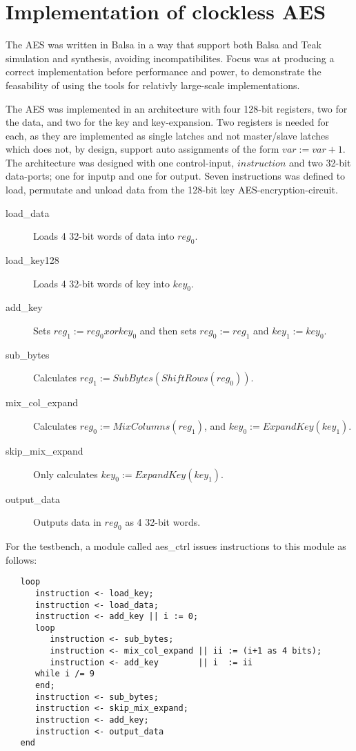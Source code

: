 \section{Implementation of clockless AES}

The AES was written in Balsa in a way that support both Balsa and
Teak simulation and synthesis, avoiding incompatibilites. Focus was at
producing a correct implementation before performance and power, to
demonstrate the feasability of using the tools for relativly
large-scale implementations.

The AES was implemented in an architecture with four 128-bit
registers, two for the data, and two for the key and
key-expansion. Two registers is needed for each, as they are
implemented as single latches and not master/slave latches which does
not, by design, support auto assignments of the form 
$var := var + 1$. The architecture was designed with one control-input,
$instruction$ and two 32-bit data-ports; one for inputp and one for
output. Seven instructions was defined to load, permutate and unload
data from the 128-bit key AES-encryption-circuit.

\begin{description}
  \item[load\_data] Loads 4 32-bit words of data into $reg_0$.
  \item[load\_key128] Loads 4 32-bit words of key into $key_0$.
  \item[add\_key] Sets $reg_1 := reg_0 xor key_0$ and then sets $reg_0
    := reg_1$ and $key_1 := key_0$.
  \item[sub\_bytes] Calculates $reg_1 := SubBytes(ShiftRows(reg_0))$.
  \item[mix\_col\_expand] Calculates $reg_0 := MixColumns(reg_1)$, and
    $key_0 := ExpandKey(key_1)$.
  \item[skip\_mix\_expand] Only calculates $key_0 := ExpandKey(key_1)$.
  \item[output\_data] Outputs data in $reg_0$ as 4 32-bit words.
\end{description}

For the testbench, a module called aes\_ctrl issues instructions to
this module as follows:
\begin{verbatim}
   loop
      instruction <- load_key;
      instruction <- load_data;
      instruction <- add_key || i := 0;
      loop
         instruction <- sub_bytes;
         instruction <- mix_col_expand || ii := (i+1 as 4 bits);
         instruction <- add_key        || i  := ii
      while i /= 9
      end;
      instruction <- sub_bytes;
      instruction <- skip_mix_expand;
      instruction <- add_key;
      instruction <- output_data
   end
\end{verbatim}


